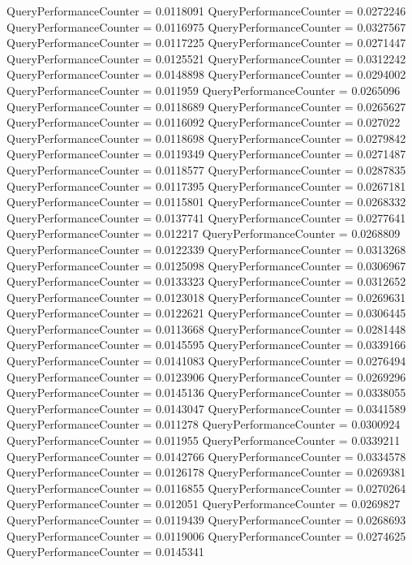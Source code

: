 \documentclass[9pt]{article}
\theoremstyle{plain}
\theoremstyle{definition}
\theoremstyle{remark}
\numberwithin{equation}{section}
\begin{document}
QueryPerformanceCounter  =  0.0118091
QueryPerformanceCounter  =  0.0272246
QueryPerformanceCounter  =  0.0116975
QueryPerformanceCounter  =  0.0327567
QueryPerformanceCounter  =  0.0117225
QueryPerformanceCounter  =  0.0271447
QueryPerformanceCounter  =  0.0125521
QueryPerformanceCounter  =  0.0312242
QueryPerformanceCounter  =  0.0148898
QueryPerformanceCounter  =  0.0294002
QueryPerformanceCounter  =  0.011959
QueryPerformanceCounter  =  0.0265096
QueryPerformanceCounter  =  0.0118689
QueryPerformanceCounter  =  0.0265627
QueryPerformanceCounter  =  0.0116092
QueryPerformanceCounter  =  0.027022
QueryPerformanceCounter  =  0.0118698
QueryPerformanceCounter  =  0.0279842
QueryPerformanceCounter  =  0.0119349
QueryPerformanceCounter  =  0.0271487
QueryPerformanceCounter  =  0.0118577
QueryPerformanceCounter  =  0.0287835
QueryPerformanceCounter  =  0.0117395
QueryPerformanceCounter  =  0.0267181
QueryPerformanceCounter  =  0.0115801
QueryPerformanceCounter  =  0.0268332
QueryPerformanceCounter  =  0.0137741
QueryPerformanceCounter  =  0.0277641
QueryPerformanceCounter  =  0.012217
QueryPerformanceCounter  =  0.0268809
QueryPerformanceCounter  =  0.0122339
QueryPerformanceCounter  =  0.0313268
QueryPerformanceCounter  =  0.0125098
QueryPerformanceCounter  =  0.0306967
QueryPerformanceCounter  =  0.0133323
QueryPerformanceCounter  =  0.0312652
QueryPerformanceCounter  =  0.0123018
QueryPerformanceCounter  =  0.0269631
QueryPerformanceCounter  =  0.0122621
QueryPerformanceCounter  =  0.0306445
QueryPerformanceCounter  =  0.0113668
QueryPerformanceCounter  =  0.0281448
QueryPerformanceCounter  =  0.0145595
QueryPerformanceCounter  =  0.0339166
QueryPerformanceCounter  =  0.0141083
QueryPerformanceCounter  =  0.0276494
QueryPerformanceCounter  =  0.0123906
QueryPerformanceCounter  =  0.0269296
QueryPerformanceCounter  =  0.0145136
QueryPerformanceCounter  =  0.0338055
QueryPerformanceCounter  =  0.0143047
QueryPerformanceCounter  =  0.0341589
QueryPerformanceCounter  =  0.011278
QueryPerformanceCounter  =  0.0300924
QueryPerformanceCounter  =  0.011955
QueryPerformanceCounter  =  0.0339211
QueryPerformanceCounter  =  0.0142766
QueryPerformanceCounter  =  0.0334578
QueryPerformanceCounter  =  0.0126178
QueryPerformanceCounter  =  0.0269381
QueryPerformanceCounter  =  0.0116855
QueryPerformanceCounter  =  0.0270264
QueryPerformanceCounter  =  0.012051
QueryPerformanceCounter  =  0.0269827
QueryPerformanceCounter  =  0.0119439
QueryPerformanceCounter  =  0.0268693
QueryPerformanceCounter  =  0.0119006
QueryPerformanceCounter  =  0.0274625
QueryPerformanceCounter  =  0.0145341
\end{document}
